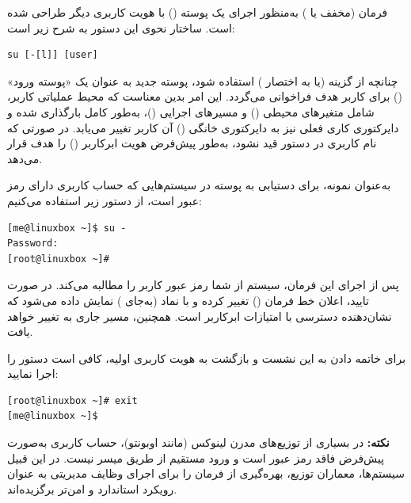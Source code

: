 فرمان  (مخفف  یا ) به‌منظور اجرای یک پوسته () با هویت کاربری دیگر طراحی شده است. ساختار نحوی این دستور به شرح زیر است:

\begin{latin}
\begin{lstlisting}
su [-[l]] [user]
\end{lstlisting}
\end{latin}

چنانچه از گزینه  (یا به اختصار \cmd{-}) استفاده شود، پوسته جدید به عنوان یک «پوسته ورود» () برای کاربر هدف فراخوانی می‌گردد. این امر بدین معناست که محیط عملیاتی کاربر، شامل متغیرهای محیطی () و مسیرهای اجرایی ()، به‌طور کامل بارگذاری شده و دایرکتوری کاری فعلی نیز به دایرکتوری خانگی () آن کاربر تغییر می‌یابد. در صورتی که نام کاربری در دستور قید نشود،  به‌طور پیش‌فرض هویت ابرکاربر () را هدف قرار می‌دهد.

به‌عنوان نمونه، برای دستیابی به پوسته  در سیستم‌هایی که حساب کاربری  دارای رمز عبور است، از دستور زیر استفاده می‌کنیم:

\begin{latin}
\begin{lstlisting}
[me@linuxbox ~]$ su -
Password:
[root@linuxbox ~]#
\end{lstlisting}
\end{latin}

پس از اجرای این فرمان، سیستم از شما رمز عبور کاربر  را مطالبه می‌کند. در صورت تایید، اعلان خط فرمان () تغییر کرده و با نماد \cmd{\#} (به‌جای \cmd{\$}) نمایش داده می‌شود که نشان‌دهنده دسترسی با امتیازات ابرکاربر است. همچنین، مسیر جاری به  تغییر خواهد یافت.

برای خاتمه دادن به این نشست و بازگشت به هویت کاربری اولیه، کافی است دستور  را اجرا نمایید:

\begin{latin}
\begin{lstlisting}
[root@linuxbox ~]# exit
[me@linuxbox ~]$
\end{lstlisting}
\end{latin}

\begin{note}
\textbf{نکته:} در بسیاری از توزیع‌های مدرن لینوکس (مانند اوبونتو)، حساب کاربری  به‌صورت پیش‌فرض فاقد رمز عبور است و ورود مستقیم از طریق  میسر نیست. در این قبیل سیستم‌ها، معماران توزیع، بهره‌گیری از فرمان  را برای اجرای وظایف مدیریتی به عنوان رویکرد استاندارد و امن‌تر برگزیده‌اند.
\end{note}


